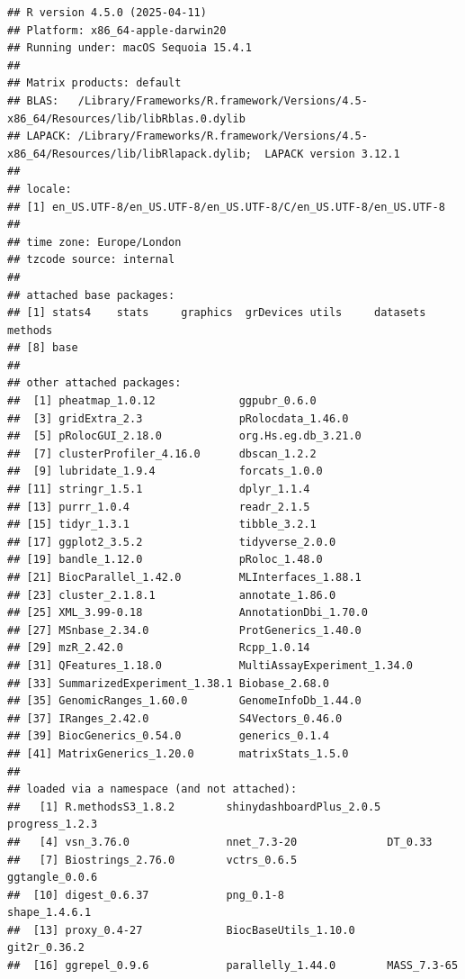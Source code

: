 \documentclass[9pt,a4paper,]{extarticle}
\begin{document}
\begin{verbatim}
## R version 4.5.0 (2025-04-11)
## Platform: x86_64-apple-darwin20
## Running under: macOS Sequoia 15.4.1
## 
## Matrix products: default
## BLAS:   /Library/Frameworks/R.framework/Versions/4.5-x86_64/Resources/lib/libRblas.0.dylib 
## LAPACK: /Library/Frameworks/R.framework/Versions/4.5-x86_64/Resources/lib/libRlapack.dylib;  LAPACK version 3.12.1
## 
## locale:
## [1] en_US.UTF-8/en_US.UTF-8/en_US.UTF-8/C/en_US.UTF-8/en_US.UTF-8
## 
## time zone: Europe/London
## tzcode source: internal
## 
## attached base packages:
## [1] stats4    stats     graphics  grDevices utils     datasets  methods  
## [8] base     
## 
## other attached packages:
##  [1] pheatmap_1.0.12             ggpubr_0.6.0               
##  [3] gridExtra_2.3               pRolocdata_1.46.0          
##  [5] pRolocGUI_2.18.0            org.Hs.eg.db_3.21.0        
##  [7] clusterProfiler_4.16.0      dbscan_1.2.2               
##  [9] lubridate_1.9.4             forcats_1.0.0              
## [11] stringr_1.5.1               dplyr_1.1.4                
## [13] purrr_1.0.4                 readr_2.1.5                
## [15] tidyr_1.3.1                 tibble_3.2.1               
## [17] ggplot2_3.5.2               tidyverse_2.0.0            
## [19] bandle_1.12.0               pRoloc_1.48.0              
## [21] BiocParallel_1.42.0         MLInterfaces_1.88.1        
## [23] cluster_2.1.8.1             annotate_1.86.0            
## [25] XML_3.99-0.18               AnnotationDbi_1.70.0       
## [27] MSnbase_2.34.0              ProtGenerics_1.40.0        
## [29] mzR_2.42.0                  Rcpp_1.0.14                
## [31] QFeatures_1.18.0            MultiAssayExperiment_1.34.0
## [33] SummarizedExperiment_1.38.1 Biobase_2.68.0             
## [35] GenomicRanges_1.60.0        GenomeInfoDb_1.44.0        
## [37] IRanges_2.42.0              S4Vectors_0.46.0           
## [39] BiocGenerics_0.54.0         generics_0.1.4             
## [41] MatrixGenerics_1.20.0       matrixStats_1.5.0          
## 
## loaded via a namespace (and not attached):
##   [1] R.methodsS3_1.8.2        shinydashboardPlus_2.0.5 progress_1.2.3          
##   [4] vsn_3.76.0               nnet_7.3-20              DT_0.33                 
##   [7] Biostrings_2.76.0        vctrs_0.6.5              ggtangle_0.0.6          
##  [10] digest_0.6.37            png_0.1-8                shape_1.4.6.1           
##  [13] proxy_0.4-27             BiocBaseUtils_1.10.0     git2r_0.36.2            
##  [16] ggrepel_0.9.6            parallelly_1.44.0        MASS_7.3-65             

\end{verbatim}
\end{document}
